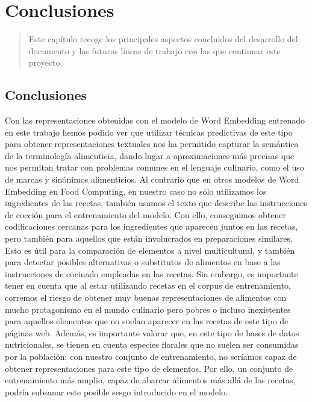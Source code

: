 \chapter{Conclusiones}
\label{ch:Conclusiones}

\begin{quote}
  Este capítulo recoge los principales aspectos concluidos del desarrollo del documento y las futuras líneas de trabajo con las que continuar este proyecto.
\end{quote}


\section{Conclusiones}




Con las representaciones obtenidas con el modelo de Word Embedding entrenado en este trabajo hemos podido ver que utilizar técnicas predictivas de este tipo para obtener representaciones textuales nos ha permitido capturar la semántica de la terminología alimenticia, dando lugar a aproximaciones más precisas que nos permitan tratar con problemas comunes en el lenguaje culinario, como el uso de marcas y sinónimos alimenticios. Al contrario que en otros modelos de Word Embedding en Food Computing, en nuestro caso no sólo utilizamos los ingredientes de las recetas, también usamos el texto que describe las instrucciones de cocción para el entrenamiento del modelo. Con ello, conseguimos obtener codificaciones cercanas para los ingredientes que aparecen juntos en las recetas, pero también para aquellos que están involucrados en preparaciones similares. Esto es útil para la comparación de elementos a nivel multicultural, y también para detectar posibles alternativas o substitutos de alimentos en base a las instrucciones de cocinado empleadas en las recetas. Sin embargo, es importante tener en cuenta que al estar utilizando recetas en el corpus de entrenamiento, corremos el riesgo de obtener muy buenas representaciones de alimentos con mucho protagonismo en el mundo culinario pero pobres o incluso inexistentes para aquellos elementos que no suelan aparecer en las recetas de este tipo de páginas web. Además, es importante valorar que, en este tipo de bases de datos nutricionales, se tienen en cuenta especies florales que no suelen ser consumidas por la población: con nuestro conjunto de entrenamiento, no seríamos capaz de obtener representaciones para este tipo de elementos. Por ello, un conjunto de entrenamiento más amplio, capaz de abarcar alimentos más allá de las recetas, podría subsanar este posible sesgo introducido en el modelo. 

